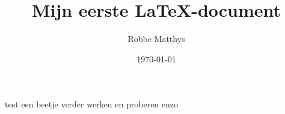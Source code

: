 \documentclass{article}
\title{Mijn eerste \LaTeX -document}
\author{Robbe Matthys}
\date{\today}
\begin{document}
	test
	een beetje verder werken en proberen enzo
\end{document}
